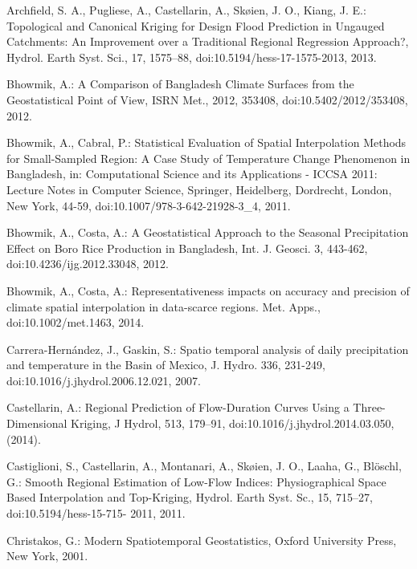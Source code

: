 \begingroup
\renewcommand{\addcontentsline}[3]{}%

\begin{thebibliography}

\bibitem{} \hangindent=1cm Archfield, S. A., Pugliese, A., Castellarin, A., Skøien, J. O., Kiang, J. E.: Topological and Canonical Kriging for Design Flood Prediction in Ungauged Catchments: An Improvement over a Traditional Regional Regression Approach?, Hydrol. Earth Syst. Sci., 17, 1575–88, doi:10.5194/hess-17-1575-2013, 2013.

\bibitem{} \hangindent=1cm Bhowmik, A.: A Comparison of Bangladesh Climate Surfaces from the Geostatistical Point of View, ISRN Met., 2012, 353408, doi:10.5402/2012/353408, 2012.

\bibitem{} \hangindent=1cm Bhowmik, A., Cabral, P.: Statistical Evaluation of Spatial Interpolation Methods for Small-Sampled Region: A Case Study of Temperature Change Phenomenon in Bangladesh, in: Computational Science and its Applications - ICCSA 2011: Lecture Notes in Computer Science, Springer, Heidelberg, Dordrecht, London, New York, 44-59, doi:10.1007/978-3-642-21928-3_4, 2011.

\bibitem{} \hangindent=1cm Bhowmik, A., Costa, A.: A Geostatistical Approach to the Seasonal Precipitation Effect on Boro Rice Production in Bangladesh, Int. J. Geosci. 3, 443-462, doi:10.4236/ijg.2012.33048, 2012.

\bibitem{} \hangindent=1cm Bhowmik, A., Costa, A.: Representativeness impacts on accuracy and precision of climate spatial interpolation in data-scarce regions. Met. Apps., doi:10.1002/met.1463, 2014.

\bibitem{} \hangindent=1cm Carrera-Hernández, J., Gaskin, S.: Spatio temporal analysis of daily precipitation and temperature in the Basin of Mexico, J. Hydro. 336, 231-249, doi:10.1016/j.jhydrol.2006.12.021, 2007.

\bibitem{} \hangindent=1cm Castellarin, A.: Regional Prediction of Flow-Duration Curves Using a Three- Dimensional Kriging, J Hydrol, 513, 179–91, doi:10.1016/j.jhydrol.2014.03.050, (2014).

\bibitem{} \hangindent=1cm Castiglioni, S., Castellarin, A., Montanari, A., Skøien, J. O., Laaha, G., Blöschl, G.: Smooth Regional Estimation of Low-Flow Indices: Physiographical Space Based Interpolation and Top-Kriging, Hydrol. Earth Syst. Sc., 15, 715–27, doi:10.5194/hess-15-715- 2011, 2011.

\bibitem{} \hangindent=1cm Christakos, G.: Modern Spatiotemporal Geostatistics, Oxford University Press, New York, 2001.


\end{thebibliography}
